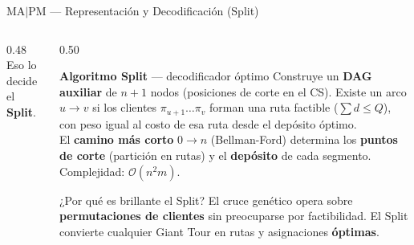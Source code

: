 \documentclass[aspectratio=169,10pt]{beamer}
\begin{document}
\begin{frame}{MA$|$PM --- Representación y Decodificación (Split)}
\begin{columns}[T,onlytextwidth]
\begin{column}{0.48\textwidth}
{      Eso lo decide el \textbf{Split}.}
    \end{column}
    \begin{column}{0.50\textwidth}
      \begin{block}{\textbf{Algoritmo Split} --- decodificador óptimo}\footnotesize
        Construye un \textbf{DAG auxiliar} de $n{+}1$ nodos
        (posiciones de corte en el CS). Existe un arco $u \to v$
        si los clientes $\pi_{u+1} \ldots \pi_v$ forman una
        ruta factible ($\sum d \le Q$), con peso igual al costo
        de esa ruta desde el depósito óptimo.\\[0.2em]
        El \textbf{camino más corto} $0 \to n$ (Bellman-Ford)
        determina los \textbf{puntos de corte} (partición en rutas)
        y el \textbf{depósito} de cada segmento.
        Complejidad: $\mathcal{O}(n^2 m)$.
      \end{block}
      \vspace{0.2em}
      \begin{exampleblock}{¿Por qué es brillante el Split?}\footnotesize
        El cruce genético opera sobre \textbf{permutaciones de clientes}
        sin preocuparse por factibilidad. El Split convierte cualquier
        Giant Tour en rutas y asignaciones \textbf{óptimas}.
      \end{exampleblock}
    \end{column}
  \end{columns}
\end{frame}
\end{document}

